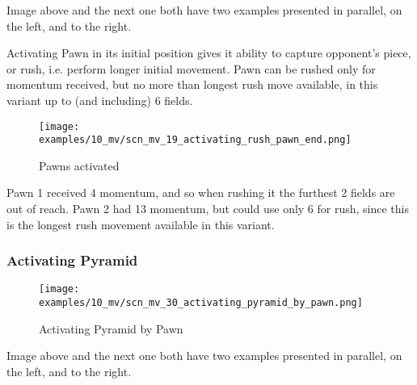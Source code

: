 \vspace*{-0.3\baselineskip}
Image above and the next one both have two examples presented in parallel, on the left,
and to the right.

Activating Pawn in its initial position gives it ability to capture opponent's
piece, or rush, i.e. perform longer initial movement. Pawn can be rushed only for
momentum received, but no more than longest rush move available, in this variant
up to (and including) 6 fields.

\clearpage %

\vspace*{-2.1\baselineskip}
\noindent
\begin{figure}[!h]
\texttt{[image: examples/10\_mv/scn\_mv\_19\_activating\_rush\_pawn\_end.png]}
\caption{Pawns activated}
\label{fig:scn_mv_19_activating_rush_pawn_end}
\end{figure}

Pawn 1 received 4 momentum, and so when rushing it the furthest 2 fields are out
of reach. Pawn 2 had 13 momentum, but could use only 6 for rush, since this is the
longest rush movement available in this variant.

\clearpage %

\subsubsection*{Activating Pyramid}

\vspace*{-1.4\baselineskip}
\noindent
\begin{figure}[!h]
\texttt{[image: examples/10\_mv/scn\_mv\_30\_activating\_pyramid\_by\_pawn.png]}
\vspace*{-1.3\baselineskip}
\caption{Activating Pyramid by Pawn}
\label{fig:scn_mv_30_activating_pyramid_by_pawn}
\end{figure}

\vspace*{-0.3\baselineskip}
Image above and the next one both have two examples presented in parallel, on the left,
and to the right.

